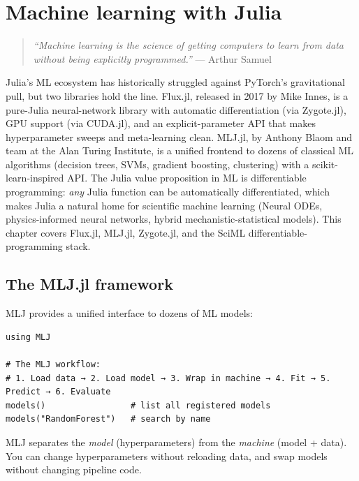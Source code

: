 \chapter{Machine learning with Julia}
\label{ch:ml-julia}

\begin{quote}
\emph{``Machine learning is the science of getting computers to learn from data without being explicitly programmed.''}
--- Arthur Samuel
\end{quote}

Julia's ML ecosystem has historically struggled against PyTorch's gravitational pull, but two libraries hold the line. Flux.jl, released in 2017 by Mike Innes, is a pure-Julia neural-network library with automatic differentiation (via Zygote.jl), GPU support (via CUDA.jl), and an explicit-parameter API that makes hyperparameter sweeps and meta-learning clean. MLJ.jl, by Anthony Blaom and team at the Alan Turing Institute, is a unified frontend to dozens of classical ML algorithms (decision trees, SVMs, gradient boosting, clustering) with a scikit-learn-inspired API. The Julia value proposition in ML is differentiable programming: \emph{any} Julia function can be automatically differentiated, which makes Julia a natural home for scientific machine learning (Neural ODEs, physics-informed neural networks, hybrid mechanistic-statistical models). This chapter covers Flux.jl, MLJ.jl, Zygote.jl, and the SciML differentiable-programming stack.

\section{The MLJ.jl framework}

MLJ provides a unified interface to dozens of ML models:

\begin{verbatim}
using MLJ

# The MLJ workflow:
# 1. Load data → 2. Load model → 3. Wrap in machine → 4. Fit → 5. Predict → 6. Evaluate
models()                 # list all registered models
models("RandomForest")   # search by name
\end{verbatim}

\begin{juliatip}
MLJ separates the \emph{model} (hyperparameters) from the \emph{machine} (model + data). You can change hyperparameters without reloading data, and swap models without changing pipeline code.
\end{juliatip}

